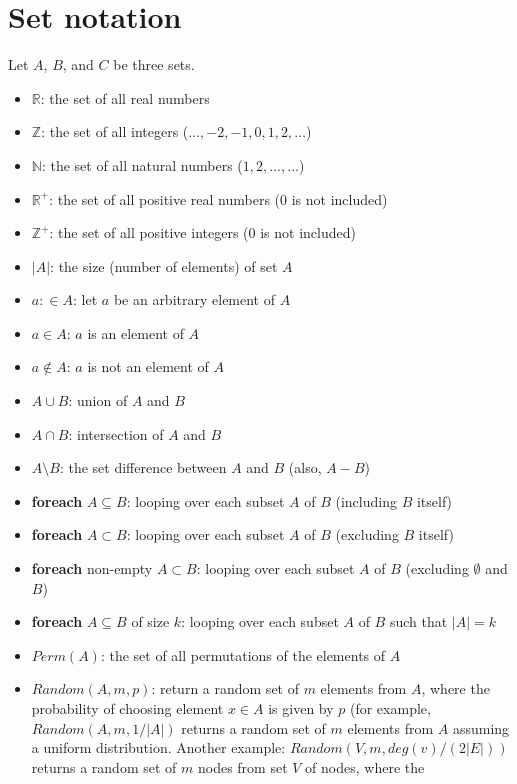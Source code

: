 \documentclass[10pt]{article}
\begin{document}
\section{Set notation}
Let $A$, $B$, and $C$ be three sets. 
\begin{itemize}
\item {\color{blue} ${\mathbb R}$}: the set of all real numbers
\item {\color{blue} ${\mathbb Z}$}: the set of all integers ($\ldots,-2,-1,0,1,2,\ldots$)
\item {\color{blue} ${\mathbb N}$}: the set of all natural numbers ($1,2,\ldots,...$)
\item {\color{blue} ${\mathbb R}^+$}: the set of all positive real numbers ($0$ is not included)
\item {\color{blue} ${\mathbb Z}^+$}: the set of all positive integers ($0$ is not included)
\item {\color{blue} $|A|$}: the size (number of elements) of set $A$
\item {\color{blue} $a :\in A$}: let $a$ be an arbitrary element of $A$
\item {\color{blue} $a \in A$}: $a$ is an element of $A$ 
\item {\color{blue} $a \notin A$}: $a$ is not an element of $A$
\item {\color{blue} $A \cup B$}: union of $A$ and $B$
\item {\color{blue} $A \cap B$}: intersection of $A$ and $B$
\item {\color{blue} $A \setminus B$}: the set difference between $A$ and $B$ (also, $A - B$)
\item {\color{blue} {\bf foreach} $A \subseteq B$}: looping over each subset $A$ of $B$ (including $B$ itself)
\item {\color{blue} {\bf foreach} $A \subset B$}: looping over each subset $A$ of $B$ (excluding $B$ itself)
\item {\color{blue} {\bf foreach} non-empty $A \subset B$}: looping over each subset $A$ of $B$ (excluding $\emptyset$ and $B$)
\item {\color{blue} {\bf foreach} $A \subseteq B$ of size $k$}: looping over each subset $A$ of $B$ such that $|A| = k$
\item {\color{blue} $Perm(A)$}: the set of all permutations of the elements of $A$
\item {\color{blue} $Random(A,m,p)$}: return a random set of $m$ elements from $A$, where the probability of choosing element 
 $x \in A$ is given by $p$ (for example, $Random(A,m,1/|A|)$ returns a random set of $m$ elements from $A$ assuming a uniform distribution. Another example: $Random(V,m,deg(v)/(2|E|))$ returns a random set of $m$ nodes from set $V$ of nodes, where the 

\end{itemize}
\end{document}

